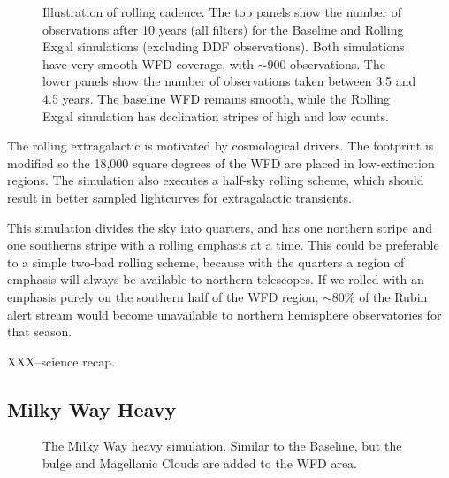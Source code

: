 \begin{figure}
\caption{Illustration of rolling cadence. The top panels show the number of observations after 10 years (all filters) for the Baseline and Rolling Exgal simulations (excluding DDF observations). Both simulations have very smooth WFD coverage, with $\sim$900 observations.  The lower panels show the number of observations taken between 3.5 and 4.5 years.  The baseline WFD remains smooth, while the Rolling Exgal simulation has declination stripes of high and low counts.}\label{fig:exgalroll}
\end{figure}


The rolling extragalactic is motivated by cosmological drivers. The footprint is modified so the 18,000 square degrees of the WFD are placed in low-extinction regions. The simulation also executes a half-sky rolling scheme, which should result in better sampled lightcurves for extragalactic transients.

This simulation divides the sky into quarters, and has one northern stripe and one southerns stripe with a rolling emphasis at a time. This could be preferable to a simple two-bad rolling scheme, because with the quarters a region of emphasis will always be available to northern telescopes. If we rolled with an emphasis purely on the southern half of the WFD region, $\sim$80\% of the Rubin alert stream would become unavailable to northern hemisphere observatories for that season.

XXX--science recap. 


\subsection{Milky Way Heavy}
\begin{figure}
\caption{The Milky Way heavy simulation. Similar to the Baseline, but the bulge and Magellanic Clouds are added to the WFD area. }\label{fig:mwheavy}
\end{figure}


